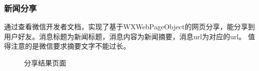 \documentclass[UTF8]{article}
\begin{document}
\subsubsection{新闻分享}
通过查看微信开发者文档，实现了基于WXWebPageObject的网页分享，能分享到用户好友。消息标题为新闻标题，消息内容为新闻摘要，消息url为对应的url。
值得注意的是微信要求摘要文字不能过长。
\begin{figure}[htbp]
    \centering
    \centering
    \caption{分享结果页面}
    \end{figure}
\end{document}
